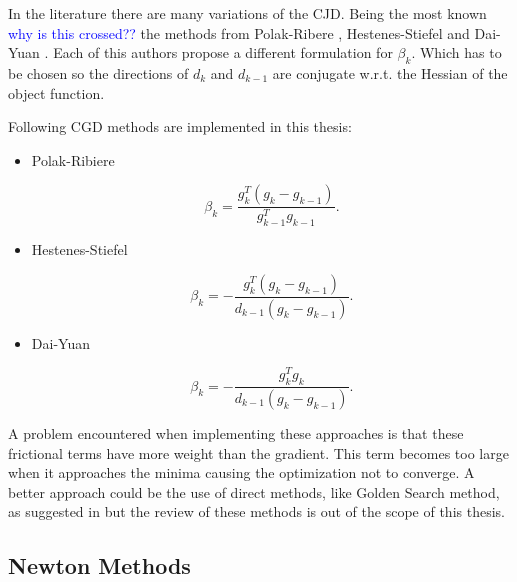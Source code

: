 In the literature there are many variations of the CJD. Being the most known \textcolor{blue}{why is this crossed?? } the methods from Polak-Ribere \cite{polak},  Hestenes-Stiefel \cite{hestenes} and Dai-Yuan \cite{dai}. Each of this authors propose a different formulation for $\beta_k$. Which has to be chosen so the directions of $d_{k}$ and $d_{k-1}$ are conjugate w.r.t. the Hessian of the object function.

Following CGD methods are implemented in this thesis:

\begin{itemize}
	\item Polak-Ribiere
	
	\begin{equation}
	\beta_k = \frac{ g_k^{T} (g_k - g_{k-1})}{ g_{k-1}^{T} g_{k-1}}	.
	\end{equation}
	
	\item Hestenes-Stiefel
	
	\begin{equation}
	\beta_k = - \frac{ g_k^{T} (g_k - g_{k-1})}{d_{k-1} (g_k - g_{k-1})}	.
	\end{equation}	
	
	\item Dai-Yuan
	
	\begin{equation}
	\beta_k =- \frac{ g_k^{T} g_k }{d_{k-1} (g_k - g_{k-1})}		.
	\end{equation}
	
	
\end{itemize}






A problem encountered when implementing these approaches is that these frictional terms have more weight than the gradient. This term becomes too large when it approaches the minima causing the optimization not to converge. A better approach could be the use of direct methods, like Golden Search method, as suggested in \cite{CGD_converge} but the review of these methods is out of the scope of this thesis.











\subsection{Newton Methods}
\label{subsec:newton}

